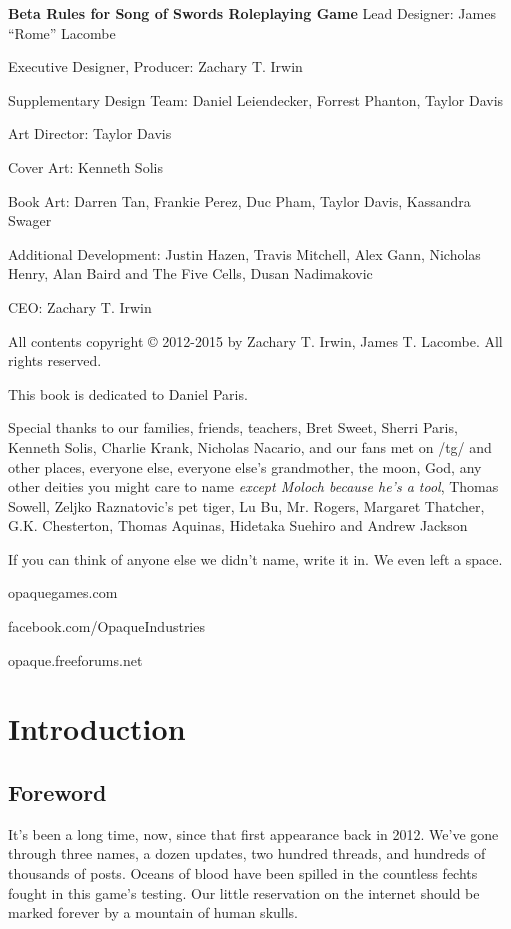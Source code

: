 \documentclass[oneside,11pt,english]{book}
\begin{document}
\begin{center}
\vfill
\textbf{Beta Rules for Song of Swords Roleplaying Game}
Lead Designer: James “Rome” Lacombe\par
Executive Designer, Producer: Zachary T. Irwin\par
Supplementary Design Team: Daniel Leiendecker, Forrest Phanton, Taylor Davis\par
Art Director: Taylor Davis\par
Cover Art: Kenneth Solis\par
Book Art: Darren Tan, Frankie Perez, Duc Pham, Taylor Davis, Kassandra Swager\par


Additional Development: Justin Hazen, Travis Mitchell, Alex Gann, Nicholas Henry, Alan Baird and The Five Cells, Dusan Nadimakovic\par
CEO: Zachary T. Irwin\par


All contents copyright © 2012-2015 by Zachary T. Irwin, James T. Lacombe. All rights reserved.


This book is dedicated to Daniel Paris.
\vfill

Special thanks to our families, friends, teachers, Bret Sweet, Sherri Paris, Kenneth Solis, Charlie Krank, Nicholas Nacario, and our fans met on /tg/ and other places, everyone else, everyone else’s grandmother, the moon, God, any other deities you might care to name \textit{except Moloch because he’s a tool}, Thomas Sowell, Zeljko Raznatovic’s pet tiger, Lu Bu, Mr. Rogers, Margaret Thatcher, G.K. Chesterton, Thomas Aquinas, Hidetaka Suehiro and Andrew Jackson

\vspace{1cm}
If you can think of anyone else we didn’t name, write it in. We even left a space. 

\vfill
opaquegames.com\par
facebook.com/OpaqueIndustries\par
opaque.freeforums.net\par
\end{center}
\clearpage
\mainmatter
\chapter{Introduction}\label{ch:intro}
\newpage
\section*{Foreword}
It’s been a long time, now, since that first appearance back in 2012. We’ve gone through three names, a 
dozen updates, two hundred threads, and hundreds of thousands of posts. Oceans of blood have been 
spilled in the countless fechts fought in this game’s testing. Our little reservation on the internet should be 
marked forever by a mountain of human skulls. 
\end{document}
